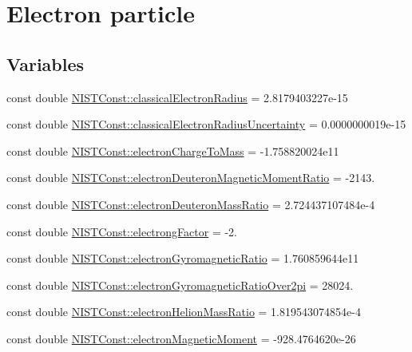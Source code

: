 \hypertarget{group___n_i_s_t_const-_electron}{}\section{Electron particle}
\label{group___n_i_s_t_const-_electron}
\subsection*{Variables}
\begin{DoxyCompactItemize}
\item 
const double \hyperlink{group___n_i_s_t_const-_electron_gac67d6a01d8d75cb66290a36f7123942b}{N\+I\+S\+T\+Const\+::classical\+Electron\+Radius} = 2.\+8179403227e-\/15
\item 
const double \hyperlink{group___n_i_s_t_const-_electron_ga421451e3f966f187c62c4d44dc16e6e8}{N\+I\+S\+T\+Const\+::classical\+Electron\+Radius\+Uncertainty} = 0.\+0000000019e-\/15
\item 
const double \hyperlink{group___n_i_s_t_const-_electron_ga941e6299b6ef4b90cc525c335d9989dc}{N\+I\+S\+T\+Const\+::electron\+Charge\+To\+Mass} = -\/1.\+758820024e11
\item 
const double \hyperlink{group___n_i_s_t_const-_electron_ga3dea53b57010903586a46d81a49fc80f}{N\+I\+S\+T\+Const\+::electron\+Deuteron\+Magnetic\+Moment\+Ratio} = -\/2143.
\item 
const double \hyperlink{group___n_i_s_t_const-_electron_gad526d455579237804ce6194b50782c0e}{N\+I\+S\+T\+Const\+::electron\+Deuteron\+Mass\+Ratio} = 2.\+724437107484e-\/4
\item 
const double \hyperlink{group___n_i_s_t_const-_electron_ga65a20f263f8ef8f324ea6d1879050a66}{N\+I\+S\+T\+Const\+::electrong\+Factor} = -\/2.
\item 
const double \hyperlink{group___n_i_s_t_const-_electron_ga7c738b9078ca0308ee45d3b8bbafadb6}{N\+I\+S\+T\+Const\+::electron\+Gyromagnetic\+Ratio} = 1.\+760859644e11
\item 
const double \hyperlink{group___n_i_s_t_const-_electron_ga67e6ebbd2c2d8043cbdb09979dc7247b}{N\+I\+S\+T\+Const\+::electron\+Gyromagnetic\+Ratio\+Over2pi} = 28024.
\item 
const double \hyperlink{group___n_i_s_t_const-_electron_ga5039598cd8a51d15d9dfbb0463c109d6}{N\+I\+S\+T\+Const\+::electron\+Helion\+Mass\+Ratio} = 1.\+819543074854e-\/4
\item 
const double \hyperlink{group___n_i_s_t_const-_electron_ga81fc83bd665b7b4fb83e9901ed7d6628}{N\+I\+S\+T\+Const\+::electron\+Magnetic\+Moment} = -\/928.\+4764620e-\/26

\end{DoxyCompactItemize}
